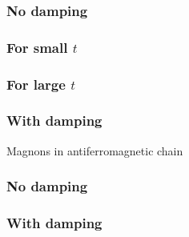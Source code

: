 \documentclass{beamer}
\begin{document}
\begin{frame}
    \frametitle{No damping}
\begin{figure}
    \centering
    
\end{figure}
\end{frame}
\begin{frame}
    \frametitle{For small $t$}
\begin{figure}
    \centering
    
\end{figure}
\end{frame}
\begin{frame}
    \frametitle{For large $t$}
\begin{figure}
    \centering
    
\end{figure}
\end{frame}


\begin{frame}
    \frametitle{With damping}
\begin{figure}
    \centering
    
\end{figure}
\end{frame}

\begin{frame}
    \vfill
    \centering
    Magnons in antiferromagnetic chain
    \vfill
\end{frame}
\begin{frame}
    \frametitle{No damping}
\begin{figure}
    \centering
    
\end{figure}
\end{frame}

\begin{frame}
    \frametitle{With damping}
\begin{figure}
    \centering
    
\end{figure}
\end{frame}


\end{document}
